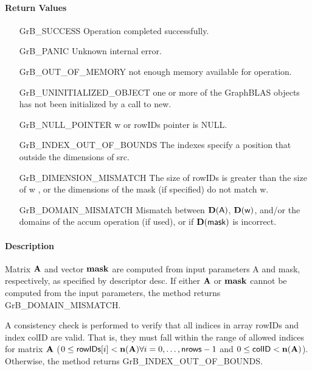 \paragraph{Return Values}

\begin{itemize}[leftmargin=2.1in]
\item[{\sf GrB\_SUCCESS}]             Operation completed successfully.
\item[{\sf GrB\_PANIC}]               Unknown internal error.
\item[{\sf GrB\_OUT\_OF\_MEMORY}]    not enough memory available for operation.
\item[{\sf GrB\_UNINITIALIZED\_OBJECT}]   one or more of the GraphBLAS objects has
                             not been initialized by a call to {\sf new}.
\item[{\sf GrB\_NULL\_POINTER}]    {\sf w} or {\sf rowIDs} pointer is {\sf NULL}.

\item[{\sf GrB\_INDEX\_OUT\_OF\_BOUNDS}]  The indexes specify a position that outside the dimensions of src.
\item[{\sf GrB\_DIMENSION\_MISMATCH}] 
       The size of {\sf rowIDs} is greater than the size of {\sf w} , 
       or the dimensions of the mask (if specified) do not match {\sf w}.
\item[{\sf GrB\_DOMAIN\_MISMATCH}]    Mismatch between $\bold{D}(\sf A)$, 
                                      $\bold{D}({\sf w})$, and/or the domains of the 
                                      {\sf accum} operation (if used), or if $\bold{D}(\sf mask)$ is incorrect.
\end{itemize}

\paragraph{Description}

Matrix ${\bf A}$ and vector ${\bf mask}$ are computed from input
parameters {\sf A} and {\sf mask}, respectively, as specified by
descriptor {\sf desc}.  If either ${\bf A}$ or ${\bf mask}$
cannot be computed from the input parameters, the method returns {\sf
GrB\_DOMAIN\_MISMATCH}.

A consistency check is performed to verify that all indices in array
{\sf rowIDs} and index {\sf colID} are valid. That is, they must fall within the range of allowed
indices for matrix ${\bf A}$ ($0 \leq {\sf rowIDs}[i] < \bold{n}({\bf A})
\forall i = 0,\ldots,{\sf nrows}-1$ and
$0 \leq {\sf colID} < \bold{n}({\bf A})$).  Otherwise, the method returns {\sf
GrB\_INDEX\_OUT\_OF\_BOUNDS}.

